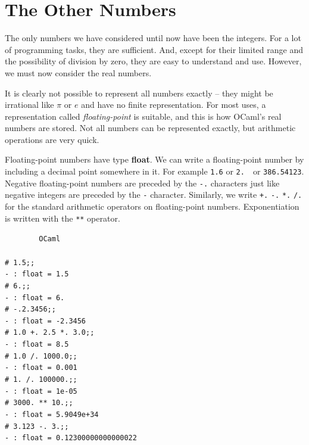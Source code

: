 \documentclass[]{book}
\newcommand{\smspace}{\vspace{4mm}}
\begin{document}
\pagestyle{empty}


\chapter{The Other Numbers}
\pagestyle{fancy}
\label{gettingreal}

The only numbers we have considered until now have been the integers. For a lot of programming tasks, they are sufficient. And, except for their limited range and the possibility of division by zero, they are easy to understand and use. However, we must now consider the real numbers.

It is clearly not possible to represent all numbers exactly -- they might be irrational like $\pi$ or $e$ and have no finite representation. For most uses, a representation called \textit{floating-point} is suitable, and this is how OCaml's real numbers are stored. Not all numbers can be represented exactly, but arithmetic operations are very quick.

Floating-point numbers have type \textbf{\textrm{float}}. We can write a floating-point number by including a decimal point somewhere in it. For example \verb!1.6! or \verb!2.!\!\!\ \ or \texttt{386.54123}. Negative floating-point numbers are preceded by the \verb!-.! characters just like negative integers are preceded by the \verb!-! character. Similarly, we write \verb!+.! \verb!-.! \verb!*.! \verb!/.! for the standard arithmetic operators on floating-point numbers. Exponentiation is written with the \verb!**! operator.

\smspace
\noindent\verb!        OCaml!\\
\noindent\\
\noindent\verb!# 1.5;;!\\
\verb!- : float = 1.5!\\
\verb!# 6.;;!\\
\verb!- : float = 6.!\\
\verb!# -.2.3456;;!\\
\verb!- : float = -2.3456!\\
\verb!# 1.0 +. 2.5 *. 3.0;;!\\
\verb!- : float = 8.5!\\
\verb!# 1.0 /. 1000.0;;!\\
\verb!- : float = 0.001!\\
\verb!# 1. /. 100000.;;!\\
\verb!- : float = 1e-05!\\
\verb!# 3000. ** 10.;;!\\
\verb!- : float = 5.9049e+34!\\
\verb!# 3.123 -. 3.;;!\\
\verb!- : float = 0.12300000000000022!\vphantom{g}
\smspace
\end{document}
